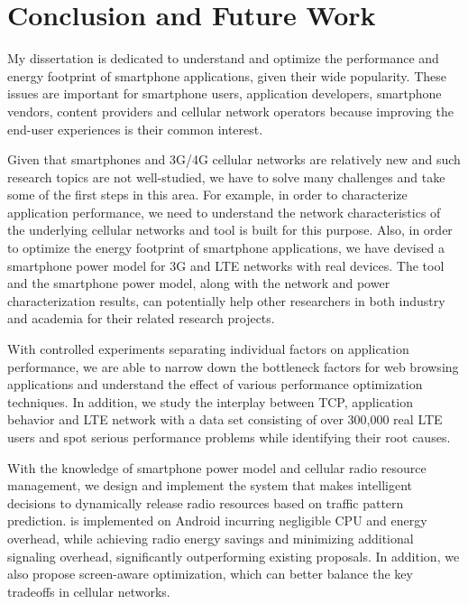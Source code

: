 \chapter{Conclusion and Future Work}
\label{chap:conc}

My dissertation is dedicated to understand and optimize the performance and energy footprint of smartphone applications, given their wide popularity. These issues are important for smartphone users, application developers, smartphone vendors, content providers and cellular network operators because improving the end-user experiences is their common interest. 

Given that smartphones and 3G/4G cellular networks are relatively new and such research topics are not well-studied, we have to solve many challenges and take some of the first steps in this area. For example, in order to characterize application performance, we need to understand the network characteristics of the underlying cellular networks and \mobiperf tool is built for this purpose. Also, in order to optimize the energy footprint of smartphone applications, we have devised a smartphone power model for 3G and LTE networks with real devices. The \mobiperf tool and the smartphone power model, along with the network and power characterization results, can potentially help other researchers in both industry and academia for their related research projects.

With controlled experiments separating individual factors on application performance, we are able to narrow down the bottleneck factors for web browsing applications and understand the effect of various performance optimization techniques. In addition, we study the interplay between TCP, application behavior and LTE network with a data set consisting of over 300,000 real LTE users and spot serious performance problems while identifying their root causes.

With the knowledge of smartphone power model and cellular radio resource management, we design and implement the \NAME system that makes intelligent decisions to dynamically release radio resources based on traffic pattern prediction. \NAME is implemented on Android incurring negligible CPU and energy overhead, while achieving radio energy savings and minimizing additional signaling overhead, significantly outperforming existing proposals. In addition, we also propose screen-aware optimization, which can better balance the key tradeoffs in cellular networks.

